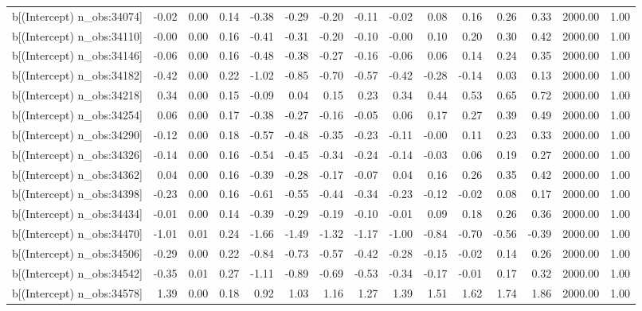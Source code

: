 \begin{table}[ht]
\begin{tabular}{rrrrrrrrrrrrrrr}
  b[(Intercept) n\_obs:34074] & -0.02 & 0.00 & 0.14 & -0.38 & -0.29 & -0.20 & -0.11 & -0.02 & 0.08 & 0.16 & 0.26 & 0.33 & 2000.00 & 1.00 \\ 
  b[(Intercept) n\_obs:34110] & -0.00 & 0.00 & 0.16 & -0.41 & -0.31 & -0.20 & -0.10 & -0.00 & 0.10 & 0.20 & 0.30 & 0.42 & 2000.00 & 1.00 \\ 
  b[(Intercept) n\_obs:34146] & -0.06 & 0.00 & 0.16 & -0.48 & -0.38 & -0.27 & -0.16 & -0.06 & 0.06 & 0.14 & 0.24 & 0.35 & 2000.00 & 1.00 \\ 
  b[(Intercept) n\_obs:34182] & -0.42 & 0.00 & 0.22 & -1.02 & -0.85 & -0.70 & -0.57 & -0.42 & -0.28 & -0.14 & 0.03 & 0.13 & 2000.00 & 1.00 \\ 
  b[(Intercept) n\_obs:34218] & 0.34 & 0.00 & 0.15 & -0.09 & 0.04 & 0.15 & 0.23 & 0.34 & 0.44 & 0.53 & 0.65 & 0.72 & 2000.00 & 1.00 \\ 
  b[(Intercept) n\_obs:34254] & 0.06 & 0.00 & 0.17 & -0.38 & -0.27 & -0.16 & -0.05 & 0.06 & 0.17 & 0.27 & 0.39 & 0.49 & 2000.00 & 1.00 \\ 
  b[(Intercept) n\_obs:34290] & -0.12 & 0.00 & 0.18 & -0.57 & -0.48 & -0.35 & -0.23 & -0.11 & -0.00 & 0.11 & 0.23 & 0.33 & 2000.00 & 1.00 \\ 
  b[(Intercept) n\_obs:34326] & -0.14 & 0.00 & 0.16 & -0.54 & -0.45 & -0.34 & -0.24 & -0.14 & -0.03 & 0.06 & 0.19 & 0.27 & 2000.00 & 1.00 \\ 
  b[(Intercept) n\_obs:34362] & 0.04 & 0.00 & 0.16 & -0.39 & -0.28 & -0.17 & -0.07 & 0.04 & 0.16 & 0.26 & 0.35 & 0.42 & 2000.00 & 1.00 \\ 
  b[(Intercept) n\_obs:34398] & -0.23 & 0.00 & 0.16 & -0.61 & -0.55 & -0.44 & -0.34 & -0.23 & -0.12 & -0.02 & 0.08 & 0.17 & 2000.00 & 1.00 \\ 
  b[(Intercept) n\_obs:34434] & -0.01 & 0.00 & 0.14 & -0.39 & -0.29 & -0.19 & -0.10 & -0.01 & 0.09 & 0.18 & 0.26 & 0.36 & 2000.00 & 1.00 \\ 
  b[(Intercept) n\_obs:34470] & -1.01 & 0.01 & 0.24 & -1.66 & -1.49 & -1.32 & -1.17 & -1.00 & -0.84 & -0.70 & -0.56 & -0.39 & 2000.00 & 1.00 \\ 
  b[(Intercept) n\_obs:34506] & -0.29 & 0.00 & 0.22 & -0.84 & -0.73 & -0.57 & -0.42 & -0.28 & -0.15 & -0.02 & 0.14 & 0.26 & 2000.00 & 1.00 \\ 
  b[(Intercept) n\_obs:34542] & -0.35 & 0.01 & 0.27 & -1.11 & -0.89 & -0.69 & -0.53 & -0.34 & -0.17 & -0.01 & 0.17 & 0.32 & 2000.00 & 1.00 \\ 
  b[(Intercept) n\_obs:34578] & 1.39 & 0.00 & 0.18 & 0.92 & 1.03 & 1.16 & 1.27 & 1.39 & 1.51 & 1.62 & 1.74 & 1.86 & 2000.00 & 1.00 \\ 

\end{tabular}
\end{table}
